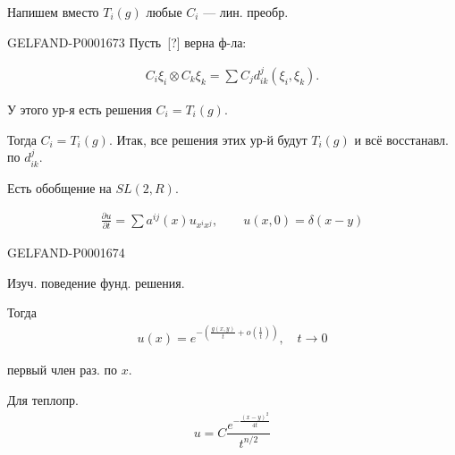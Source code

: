 Напишем вместо $T_i(g)$ любые $C_i$ — лин. преобр.

\begin{GelfandAdjacentEvidence}{GELFAND-P000167}{3}
Пусть\, [?] верна ф-ла:
\end{GelfandAdjacentEvidence}

\begin{gather*}
C_i\xi_i\otimes C_k\xi_k=\sum C_jd^j_{ik}(\xi_i,\xi_k).
\end{gather*}


У этого ур-я есть решения $C_i=T_i(g)$.

Тогда $C_i=T_i(g)$. Итак, все решения этих ур-й будут $T_i(g)$ и всё восстанавл. по $d^j_{ik}$.

Есть обобщение на $SL(2,R)$.




\begin{gather*}
\frac{\partial u}{\partial t}=\sum a^{ij}(x)u_{x^ix^j},\qquad
u(x,0)=\delta(x-y)
\end{gather*}

\begin{GelfandAdjacentEvidence}{GELFAND-P000167}{4}

Изуч. поведение фунд. решения.
\end{GelfandAdjacentEvidence}




Тогда
\begin{gather*}
u(x)=e^{-\left(\frac{g(x,y)}{t}+o(\frac{1}{t})\right)},\quad t\longrightarrow0
\end{gather*}


первый член раз. по $x$.


Для теплопр.
\begin{gather*}
u=C\dfrac{e^{-\frac{(x-y)^2}{4t}}}{t^{n/2}}
\end{gather*}

